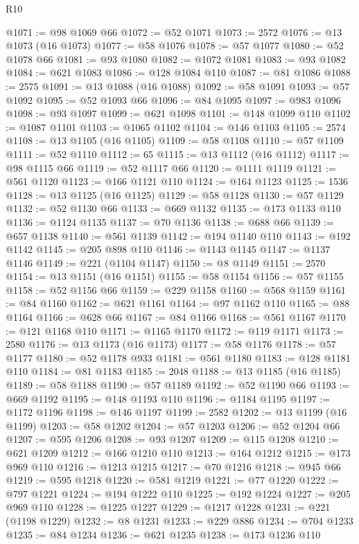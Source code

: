 \begin{lexlean}{R10}
\begin{coremodule}
@1071 := @98 @1069 @66
@1072 := @52 @1071
@1073 := 2572
@1076 := @13 @1073 (@16 @1073)
@1077 := @58 @1076
@1078 := @57 @1077
@1080 := @52 @1078 @66
@1081 := @93 @1080
@1082 := @1072 @1081
@1083 := @93 @1082
@1084 := @621 @1083
@1086 := @128 @1084 @110
@1087 := @81 @1086
@1088 := 2575
@1091 := @13 @1088 (@16 @1088)
@1092 := @58 @1091
@1093 := @57 @1092
@1095 := @52 @1093 @66
@1096 := @84 @1095
@1097 := @983 @1096
@1098 := @93 @1097
@1099 := @621 @1098
@1101 := @148 @1099 @110
@1102 := @1087 @1101
@1103 := @1065 @1102
@1104 := @146 @1103
@1105 := 2574
@1108 := @13 @1105 (@16 @1105)
@1109 := @58 @1108
@1110 := @57 @1109
@1111 := @52 @1110
@1112 := 65
@1115 := @13 @1112 (@16 @1112)
@1117 := @98 @1115 @66
@1119 := @52 @1117 @66
@1120 := @1111 @1119
@1121 := @561 @1120
@1123 := @166 @1121 @110
@1124 := @164 @1123
@1125 := 1536
@1128 := @13 @1125 (@16 @1125)
@1129 := @58 @1128
@1130 := @57 @1129
@1132 := @52 @1130 @66
@1133 := @669 @1132
@1135 := @173 @1133 @110
@1136 := @1124 @1135
@1137 := @70 @1136
@1138 := @688 @66
@1139 := @657 @1138
@1140 := @561 @1139
@1142 := @194 @1140 @110
@1143 := @192 @1142
@1145 := @205 @898 @110
@1146 := @1143 @1145
@1147 := @1137 @1146
@1149 := @221 (@1104 @1147)
@1150 := @8 @1149
@1151 := 2570
@1154 := @13 @1151 (@16 @1151)
@1155 := @58 @1154
@1156 := @57 @1155
@1158 := @52 @1156 @66
@1159 := @229 @1158
@1160 := @568 @1159
@1161 := @84 @1160
@1162 := @621 @1161
@1164 := @97 @1162 @110
@1165 := @88 @1164
@1166 := @628 @66
@1167 := @84 @1166
@1168 := @561 @1167
@1170 := @121 @1168 @110
@1171 := @1165 @1170
@1172 := @119 @1171
@1173 := 2580
@1176 := @13 @1173 (@16 @1173)
@1177 := @58 @1176
@1178 := @57 @1177
@1180 := @52 @1178 @933
@1181 := @561 @1180
@1183 := @128 @1181 @110
@1184 := @81 @1183
@1185 := 2048
@1188 := @13 @1185 (@16 @1185)
@1189 := @58 @1188
@1190 := @57 @1189
@1192 := @52 @1190 @66
@1193 := @669 @1192
@1195 := @148 @1193 @110
@1196 := @1184 @1195
@1197 := @1172 @1196
@1198 := @146 @1197
@1199 := 2582
@1202 := @13 @1199 (@16 @1199)
@1203 := @58 @1202
@1204 := @57 @1203
@1206 := @52 @1204 @66
@1207 := @595 @1206
@1208 := @93 @1207
@1209 := @115 @1208
@1210 := @621 @1209
@1212 := @166 @1210 @110
@1213 := @164 @1212
@1215 := @173 @969 @110
@1216 := @1213 @1215
@1217 := @70 @1216
@1218 := @945 @66
@1219 := @595 @1218
@1220 := @581 @1219
@1221 := @77 @1220
@1222 := @797 @1221
@1224 := @194 @1222 @110
@1225 := @192 @1224
@1227 := @205 @969 @110
@1228 := @1225 @1227
@1229 := @1217 @1228
@1231 := @221 (@1198 @1229)
@1232 := @8 @1231
@1233 := @229 @886
@1234 := @704 @1233
@1235 := @84 @1234
@1236 := @621 @1235
@1238 := @173 @1236 @110

\end{coremodule}
\end{lexlean}
